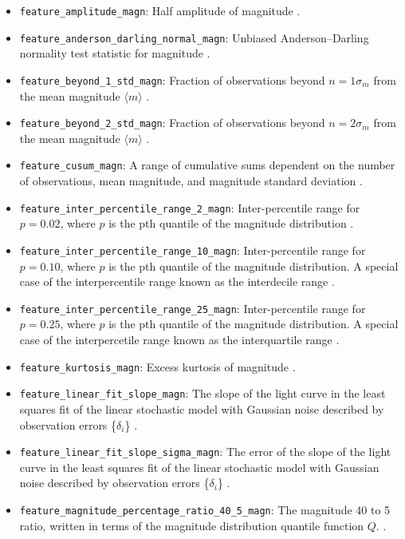 \documentclass[twocolumn]{aastex63}
\begin{document}
\begin{itemize}
    \item \texttt{feature\_amplitude\_magn}: Half amplitude of magnitude \citep{Malanchev2021}.
    \item \texttt{feature\_anderson\_darling\_normal\_magn}: Unbiased Anderson–Darling normality test statistic for magnitude \citep{Malanchev2021}.
    \item \texttt{feature\_beyond\_1\_std\_magn}: Fraction of observations beyond $n=1 \sigma_{m}$ from the mean magnitude $\langle m \rangle$ \citep{D'Isanto2016}.
    \item \texttt{feature\_beyond\_2\_std\_magn}: Fraction of observations beyond $n=2 \sigma_{m}$ from the mean magnitude $\langle m \rangle$ \citep{D'Isanto2016}.
    \item \texttt{feature\_cusum\_magn}: A range of cumulative sums dependent on the number of observations, mean magnitude, and magnitude standard deviation \citep{Kim2014}.
    \item \texttt{feature\_inter\_percentile\_range\_2\_magn}: Inter-percentile range for $p=0.02$, where $p$ is the pth quantile of the magnitude distribution \citep{Malanchev2021}.
    \item \texttt{feature\_inter\_percentile\_range\_10\_magn}: Inter-percentile range for $p=0.10$, where $p$ is the pth quantile of the magnitude distribution. A special case of the interpercentile range known as the interdecile range \citep{Malanchev2021}.
    \item \texttt{feature\_inter\_percentile\_range\_25\_magn}: Inter-percentile range for $p=0.25$, where $p$ is the pth quantile of the magnitude distribution. A special case of the interpercetile range known as the interquartile range \citep{Malanchev2021}.
    \item \texttt{feature\_kurtosis\_magn}: Excess kurtosis of magnitude \citep{Malanchev2021}.
    \item \texttt{feature\_linear\_fit\_slope\_magn}: The slope of the light curve in the least squares fit of the linear stochastic model with Gaussian noise described by observation errors \{$\delta_{i}$\} \citep{Malanchev2021}.
    \item \texttt{feature\_linear\_fit\_slope\_sigma\_magn}: The error of the slope of the light curve in the least squares fit of the linear stochastic model with Gaussian noise described by observation errors \{$\delta_{i}$\} \citep{Malanchev2021}.
    \item \texttt{feature\_magnitude\_percentage\_ratio\_40\_5\_magn}: The magnitude 40 to 5 ratio, written in terms of the magnitude distribution quantile function $Q$. \citep{D'Isanto2016}.

\end{itemize}
\end{document}
